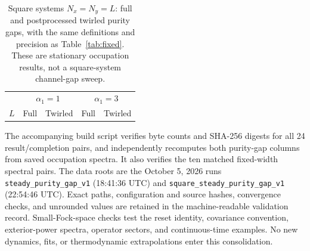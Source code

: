 \documentclass[aps,prb,onecolumn,nofootinbib,superscriptaddress,floatfix]{revtex4-2}
\begin{document}
\begin{table}[tbp]
\caption{Square systems $N_x=N_y=L$: full and postprocessed
twirled purity gaps, with the same definitions and precision as
Table~\ref{tab:fixed}. These are stationary occupation results,
not a square-system channel-gap sweep.}
\label{tab:square}
\begin{ruledtabular}
\begin{tabular}{rcccc}
 &\multicolumn{2}{c}{$\alpha_1=1$}
 &\multicolumn{2}{c}{$\alpha_1=3$}\\
 $L$ & Full & Twirled & Full & Twirled\\
 
\end{tabular}
\end{ruledtabular}
\end{table}

The accompanying build script verifies byte counts and SHA-256
digests for all 24 result/completion pairs, and independently
recomputes both purity-gap columns from saved occupation spectra.
It also verifies the ten matched fixed-width spectral pairs.
The data roots are the October 5, 2026 runs
\texttt{steady\_purity\_gap\_v1} (18:41:36 UTC) and
\texttt{square\_steady\_purity\_gap\_v1} (22:54:46 UTC).
Exact paths, configuration and source hashes, convergence checks,
and unrounded values are retained in the machine-readable
validation record. Small-Fock-space checks test the reset identity,
covariance convention, exterior-power spectra, operator sectors,
and continuous-time examples. No new dynamics, fits, or
thermodynamic extrapolations enter this consolidation.
\end{document}
